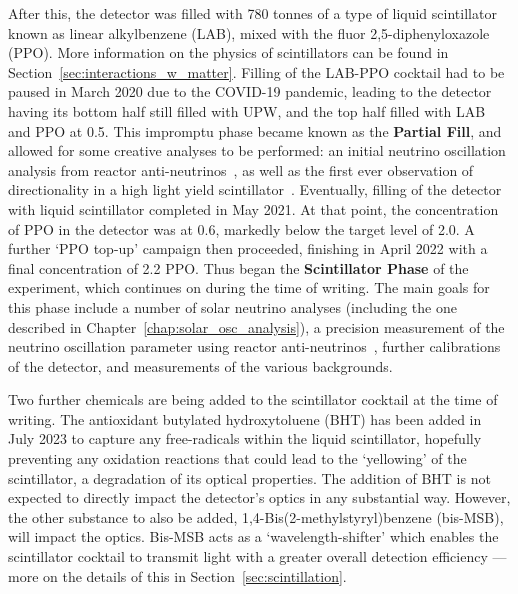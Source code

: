 After this, the detector was filled with 780 tonnes of a type of liquid scintillator known as linear alkylbenzene (LAB), mixed with the fluor 2,5-diphenyloxazole (PPO). More information on the physics of scintillators can be found in Section~\ref{sec:interactions_w_matter}. Filling of the LAB-PPO cocktail had to be paused in March 2020 due to the COVID-19 pandemic, leading to the detector having its bottom half still filled with UPW, and the top half filled with LAB and PPO at \SI{0.5}{\gpl}. This impromptu phase became known as the \textbf{Partial Fill}, and allowed for some creative analyses to be performed: an initial neutrino oscillation analysis from reactor anti-neutrinos~\cite{morton-blakeFirstMeasurementReactor2021}, %
as well as the first ever observation of directionality in a high light yield scintillator~\cite{allegaEventbyEventDirectionReconstruction2023,patonDirectionalReconstructionLiquid2023}. %
Eventually, filling of the detector with liquid scintillator completed in May 2021. At that point, the concentration of PPO in the detector was at \SI{0.6}{\gpl}, markedly below the target level of \SI{2.0}{\gpl}. A further `PPO top-up' campaign then proceeded, finishing in April 2022 with a final concentration of \SI{2.2}{\gpl} PPO. Thus began the \textbf{Scintillator Phase} of the experiment, which continues on during the time of writing. The main goals for this phase include a number of solar neutrino analyses (including the one described in Chapter~\ref{chap:solar_osc_analysis}), a precision measurement of the neutrino oscillation parameter \dmsq{} using reactor anti-neutrinos~\cite{morton-blakeFirstMeasurementReactor2021}, %
further calibrations of the detector, and measurements of the various backgrounds.

Two further chemicals are being added to the scintillator cocktail at the time of writing. The antioxidant butylated hydroxytoluene (BHT) has been added in July 2023 to capture any free-radicals within the liquid scintillator, hopefully preventing any oxidation reactions that could lead to the `yellowing' of the scintillator, a degradation of its optical properties. The addition of BHT is not expected to directly impact the detector's optics in any substantial way. However, the other substance to also be added, 1,4-Bis(2-methylstyryl)benzene (bis-MSB), will impact the optics. Bis-MSB acts as a `wavelength-shifter' which enables the scintillator cocktail to transmit light with a greater overall detection efficiency --- more on the details of this in Section~\ref{sec:scintillation}.

